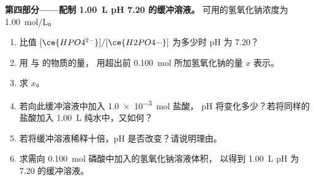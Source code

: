 \begin{problem}
\medskip
\noindent\textbf{第四部分——配制 \qty{1.00}{L} pH 7.20 的缓冲溶液。}
可用的氢氧化钠浓度为 \qty{1.00}{mol/L}。
\begin{enumerate}[resume]
  \item 比值 $[\ce{HPO4^{2-}}]/[\ce{H2PO4-}]$ 为多少时 pH 为 7.20？
  \item 用  与  的物质的量，
        用超出前 \qty{0.100}{mol} 所加氢氧化钠的量 $x$ 表示。
  \item 求 $x$。
  \item 若向此缓冲溶液中加入 \qty{1.0e-3}{mol} 盐酸，
        pH 将变化多少？若将同样的盐酸加入 \qty{1.00}{L} 纯水中，又如何？
  \item 若将缓冲溶液稀释十倍，pH 是否改变？请说明理由。
  \item 求需向 \qty{0.100}{mol} 磷酸中加入的氢氧化钠溶液体积，
        以得到 \qty{1.00}{L}
        pH 为 7.20 的缓冲溶液。
\end{enumerate}
\end{problem}
